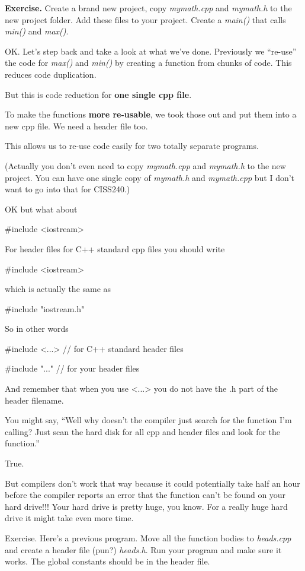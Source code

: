 \documentclass[
]{article}
\begin{document}
\textbf{Exercise.} Create a brand new project, copy \emph{mymath.cpp}
and \emph{mymath.h} to the new project folder. Add these files to your
project. Create a \emph{main()} that calls \emph{min()} and
\emph{max()}.

OK. Let's step back and take a look at what we've done. Previously we
``re-use'' the code for \emph{max()} and \emph{min()} by creating a
function from chunks of code. This reduces code duplication.

But this is code reduction for \textbf{one single cpp file}.

To make the functions \textbf{more re-usable}, we took those out and put
them into a new cpp file. We need a header file too.

This allows us to re-use code easily for two totally separate programs.

(Actually you don't even need to copy \emph{mymath.cpp} and
\emph{mymath.h} to the new project. You can have one single copy of
\emph{mymath.h} and \emph{mymath.cpp} but I don't want to go into that
for CISS240.)

OK but what about

\#include \textless iostream\textgreater{}

For header files for C++ standard cpp files you should write

\#include \textless iostream\textgreater{}

which is actually the same as

\#include "iostream.h"

So in other words

\#include \textless...\textgreater{} // for C++ standard header files

\#include "..." // for your header files

And remember that when you use \textless...\textgreater{} you do not
have the .h part of the header filename.

You might say, ``Well why doesn't the compiler just search for the
function I'm calling? Just scan the hard disk for all cpp and header
files and look for the function.''

True.

But compilers don't work that way because it could potentially take half
an hour before the compiler reports an error that the function can't be
found on your hard drive!!! Your hard drive is pretty huge, you know.
For a really huge hard drive it might take even more time.

Exercise.\textbf{ }Here's a previous program. Move all the function
bodies to \emph{heads.cpp} and create a header file (pun?)
\emph{heads.h}. Run your program and make sure it works. The global
constants should be in the header file.
\end{document}
